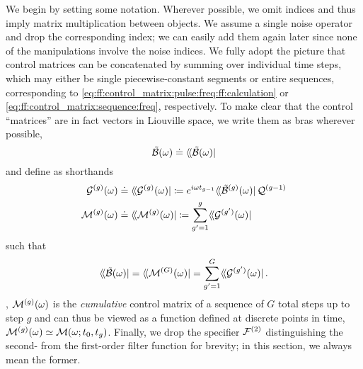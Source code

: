 We begin by setting some notation.
Wherever possible, we omit indices and thus imply matrix multiplication between objects.
We assume a single noise operator and drop the corresponding index; we can easily add them again later since none of the manipulations involve the noise indices.
We fully adopt the picture that control matrices can be concatenated by summing over individual time steps, which may either be single piecewise-constant segments or entire sequences, corresponding to \cref{eq:ff:control_matrix:pulse:freq:ff:calculation} or \cref{eq:ff:control_matrix:sequence:freq}, respectively.
To make clear that the control \enquote{matrices} are in fact vectors in Liouville space, we write them as bras wherever possible,
\begin{equation}
    \ctrlmat(\omega) \doteq \dbra*{\ctrlmat(\omega)}
\end{equation}
and define as shorthands
\begin{align}
    \mc{G}\gth{g}(\omega) & \doteq \dbra*{\mc{G}\gth{g}(\omega)}
                            \coloneqq \e^{\i\omega t_{g-1}}\dbra*{\ctrlmat\gth{g}(\omega)}\liouvQ\gth{g-1} \label{eq:app:ff:ctrlmat_step} \\
    \mc{M}\gth{g}(\omega) & \doteq \dbra*{\mc{M}\gth{g}(\omega)}
                            \coloneqq \sum_{g^{\prime}=1}^{g}\dbra*{\mc{G}\gth{g^{\prime}}(\omega)} \label{eq:app:ff:ctrlmat_cumulative}
\end{align}
such that
\begin{equation}
    \dbra*{\ctrlmat(\omega)} = \dbra*{\mc{M}\gth{G}(\omega)} = \sum_{g^{\prime}=1}^G\dbra*{\mc{G}\gth{g^{\prime}}(\omega)}.
\end{equation}
\Ie, $\mathcal{M}^{(g)}(\omega)$ is the \emph{cumulative} control matrix of a sequence of $G$ total steps up to step $g$ and can thus be viewed as a function defined at discrete points in time, $\mathcal{M}^{(g)}(\omega)\simeq \mathcal{M}(\omega;t_0,t_g)$.
Finally, we drop the specifier $\mathcal{F}^{(2)}$ distinguishing the second- from the first-order filter function for brevity; in this section, we always mean the former.

